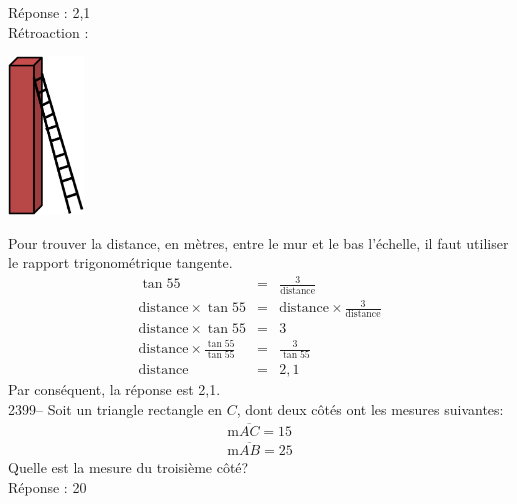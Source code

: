 \documentclass[letterpaper, 12pt]{article}
\begin{document}
R\'eponse : 2,1\\

R\'etroaction :\\
\begin{center}
 \includegraphics[width=2cm,bb=14 14 332 623]{Q2396.eps}
\end{center}
Pour trouver la distance, en m\`etres, entre le mur et le bas l'\'echelle, il faut utiliser le rapport trigonom\'etrique tangente.
\begin{eqnarray*}
 \tan{55}&=&\frac{3}{\textrm{distance}}\\[2mm]
\textrm{distance} \times \tan{55}&=&\textrm{distance} \times \frac{3}{\textrm{distance}}\\[2mm]
\textrm{distance} \times \tan{55}&=&3\\[2mm]
\textrm{distance} \times \frac{\tan{55}}{\tan{55}}&=&\frac{3}{\tan{55}}\\[2mm]
\textrm{distance} &=&2,1
\end{eqnarray*}
Par cons\'equent, la r\'eponse est 2,1.\\

2399--  Soit un triangle rectangle en $C$, dont deux c\^ot\'es ont les mesures suivantes:
\begin{eqnarray*}
  \textrm{m} \overline{AC}= 15\\
  \textrm{m} \overline{AB}= 25
\end{eqnarray*}
Quelle est la mesure du troisi\`eme c\^ot\'e?\\

R\'eponse : 20\\
\end{document}

